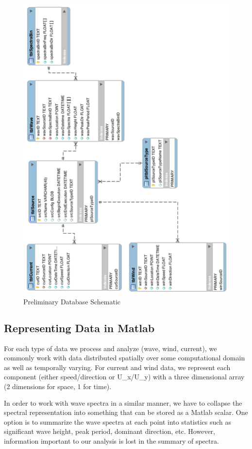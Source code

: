 \documentclass[11pt,letterpaper,oneside,reqno]{article}
\begin{document}
\begin{figure}
\includegraphics{images/wave-database-20100720.png}
\caption{Preliminary Database Schematic}
\label{db-schematic}
\end{figure}

\subsection{Representing Data in Matlab}

For each type of data we process and analyze (wave, wind, current),
we commonly work with data distributed spatially over some
computational domain as well as temporally varying. For current and
wind data, we represent each component (either speed/direction or
U\_x/U\_y) with a three dimensional array (2 dimensions for space,
1 for time).

In order to work with wave spectra in a similar manner, we have to
collapse the spectral representation into something that can be
stored as a Matlab scalar. One option is to summarize the wave
spectra at each point into statistics such as significant wave
height, peak period, dominant direction, etc. However, information
important to our analysis is lost in the summary of spectra.
\end{document}
